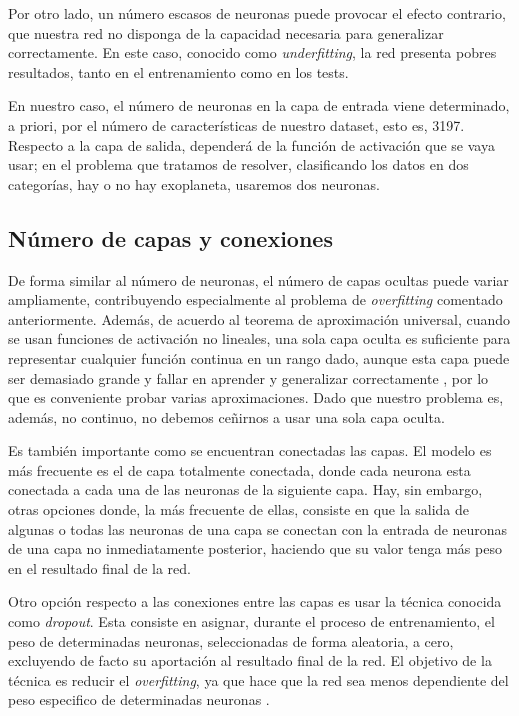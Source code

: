 Por otro lado, un número escasos de neuronas puede provocar el efecto
contrario, que nuestra red no disponga de la capacidad necesaria para
generalizar correctamente. En este caso, conocido como
\emph{underfitting}, la red presenta pobres resultados, tanto en el
entrenamiento como en los tests.

En nuestro caso, el número de neuronas en la capa de entrada viene
determinado, a priori, por el número de características de nuestro
dataset, esto es, 3197. Respecto a la capa de salida, dependerá de la
función de activación que se vaya usar; en el problema que tratamos de
resolver, clasificando los datos en dos categorías, hay o no hay
exoplaneta, usaremos dos neuronas.

\subsection{Número de capas y conexiones}\label{numero-de-capas-y-conexiones}

De forma similar al número de neuronas, el número de capas ocultas puede
variar ampliamente, contribuyendo especialmente al problema de
\emph{overfitting} comentado anteriormente. Además, de acuerdo al
teorema de aproximación universal, cuando se usan funciones de
activación no lineales, una sola capa oculta es suficiente para
representar cualquier función continua en un rango dado, aunque esta
capa puede ser demasiado grande y fallar en aprender y generalizar
correctamente \cite{Goodfellow-et-al-2016}, por lo que es conveniente probar varias
aproximaciones. Dado que nuestro problema es, además, no continuo, no
debemos ceñirnos a usar una sola capa oculta.

Es también importante como se encuentran conectadas las capas. El modelo
es más frecuente es el de capa totalmente conectada, donde cada neurona
esta conectada a cada una de las neuronas de la siguiente capa. Hay, sin
embargo, otras opciones donde, la más frecuente de ellas, consiste en
que la salida de algunas o todas las neuronas de una capa se conectan
con la entrada de neuronas de una capa no inmediatamente posterior,
haciendo que su valor tenga más peso en el resultado final de la red.

Otro opción respecto a las conexiones entre las capas es usar la técnica
conocida como \emph{dropout}. Esta consiste en asignar, durante el
proceso de entrenamiento, el peso de determinadas neuronas,
seleccionadas de forma aleatoria, a cero, excluyendo de facto su
aportación al resultado final de la red. El objetivo de la técnica es
reducir el \emph{overfitting}, ya que hace que la red sea menos
dependiente del peso especifico de determinadas neuronas \cite{JMLR:v15:srivastava14a}.

